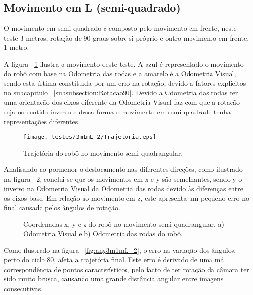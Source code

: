 \FloatBarrier
\subsection{Movimento em L (semi-quadrado)}\label{subsubsection:L}


O movimento em semi-quadrado é composto pelo movimento em frente, neste teste 3 metros, rotação de 90 graus sobre si próprio e outro movimento em frente, 1 metro.

A figura ~\ref{fig:trajRobo3m1mL_2} ilustra o movimento deste teste. A  azul é representado o movimento do robô com base na Odometria das rodas e a amarelo é a Odometria Visual, sendo esta última constituída por um erro na rotação, devido a fatores explícitos no subcapítulo ~\ref{subsubsection:Rotacao90}. Devido à Odometria das rodas ter uma orientação dos eixos diferente da Odometria Visual faz com que a rotação seja no sentido inverso e dessa forma o movimento em semi-quadrado tenha representações diferentes.

\pagebreak

\begin{figure}[h!]
	\begin{center}
		\leavevmode		
		\texttt{[image: testes/3m1mL\_2/Trajetoria.eps]}
		\caption{Trajetória do robô no movimento semi-quadrangular.}
		\label{fig:trajRobo3m1mL_2}
	\end{center}
\end{figure}



Analisando ao pormenor o deslocamento nas diferentes direções, como ilustrado na figura ~\ref{fig:pos3m1mL_2}, conclui-se que os movimentos em x e y são semelhantes, sendo y o inverso na Odometria Visual da Odometria das rodas devido às diferenças entre os eixos base. Em relação ao movimento em z, este apresenta um pequeno erro no final causado pelos ângulos de rotação.

\begin{figure}[h!]
	\centering
	\qquad
	\caption{Coordenadas x, y e z do robô  no movimento semi-quadrangular. a) Odometria Visual e b) Odometria das rodas do robô.}
	\label{fig:pos3m1mL_2}
\end{figure}


Como ilustrado na figura ~\ref{fig:ang3m1mL_2}, o erro na variação dos ângulos, perto do ciclo 80, afeta a trajetória final. Este erro é derivado de uma má correspondência de pontos característicos, pelo facto de ter rotação da câmara ter sido muito brusca, causando uma grande distância angular entre imagens consecutivas.


